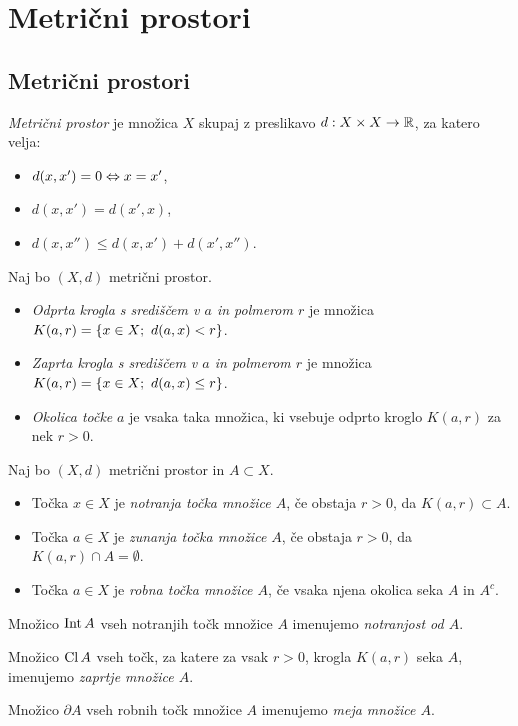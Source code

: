 \section*{Metrični prostori}
\subsection{Metrični prostori}
\begin{definicija}
    \emph{Metrični prostor} je množica $X$ skupaj z preslikavo $d: X \times X \to \mathbb{R}$, za katero velja:
    \begin{itemize}
        \item $d(x, x') = 0 \Leftrightarrow x=x'$,
        \item $d(x, x') = d(x', x)$,
        \item $d(x, x'') \leq d(x, x') + d(x', x'')$.
    \end{itemize}
\end{definicija}

\begin{definicija}
    Naj bo $(X, d)$ metrični prostor. 
    \begin{itemize}
        \item \emph{Odprta krogla s središčem v $a$ in polmerom $r$} je množica $K(a, r) = \left\{x \in X; \ d(a,x) < r\right\}$.
        \item \emph{Zaprta krogla s središčem v $a$ in polmerom $r$} je množica $K(a, r) = \left\{x \in X; \ d(a,x) \leq r\right\}$. 
        \item \emph{Okolica točke} $a$ je vsaka taka množica, ki vsebuje odprto kroglo $K(a, r)$ za nek $r>0$.
    \end{itemize}    
\end{definicija}

\begin{definicija}
    Naj bo $(X, d)$ metrični prostor in $A \subset X$.
    \begin{itemize}
        \item Točka $x \in X$ je \emph{notranja točka množice $A$}, če obstaja $r>0$, da $K(a,r) \subset A$.
        \item Točka $a \in X$ je \emph{zunanja točka množice $A$}, če obstaja $r>0$, da $K(a,r) \cap A = \emptyset$.
        \item Točka $a \in X$ je \emph{robna točka množice $A$}, če vsaka njena okolica seka $A$ in $A^c$.
    \end{itemize}
    Množico $\operatorname{Int} A$ vseh notranjih točk množice $A$ imenujemo \emph{notranjost od $A$}. 

    Množico $\operatorname{Cl} A$ vseh točk, za katere za vsak $r>0$, krogla $K(a, r)$ seka $A$, imenujemo \emph{zaprtje množice $A$}.
    
    Množico $\partial A$ vseh robnih točk množice $A$ imenujemo \emph{meja množice $A$}.     
\end{definicija}

